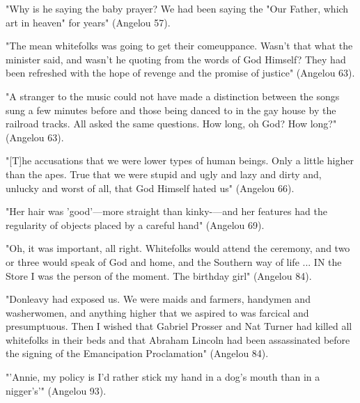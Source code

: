 "Why is he saying the baby prayer? We had been saying the "Our Father, which art in heaven" for years" (Angelou 57).


"The mean whitefolks was going to get their comeuppance. Wasn't that what the minister said, and wasn't he quoting from the words of God Himself? They had been refreshed with the hope of revenge and the promise of justice" (Angelou 63).

"A stranger to the music could not have made a distinction between the songs sung a few minutes before and those being danced to in the gay house by the railroad tracks. All asked the same questions. How long, oh God? How long?" (Angelou 63).

"[T]he accusations that we were lower types of human beings. Only a little higher than the apes. True that we were stupid and ugly and lazy and dirty and, unlucky and worst of all, that God Himself hated us" (Angelou 66).


"Her hair was 'good'—more straight than kinky-—and her
features had the regularity of objects placed by a careful hand" (Angelou 69).

"Oh, it was important, all right. Whitefolks would attend the ceremony, and two or three would speak of God and home, and the Southern way of life ... IN the Store I was the person of the moment. The birthday girl" (Angelou 84).


"Donleavy had exposed us. We were maids and farmers, handymen and washerwomen, and anything higher that we aspired to was farcical and presumptuous. Then I wished that Gabriel Prosser and Nat Turner had killed all whitefolks in their beds and that Abraham Lincoln had been assassinated before the signing of the Emancipation Proclamation" (Angelou 84).


"'Annie, my policy is I'd rather stick my hand in a dog's mouth than in a nigger's'" (Angelou 93).
